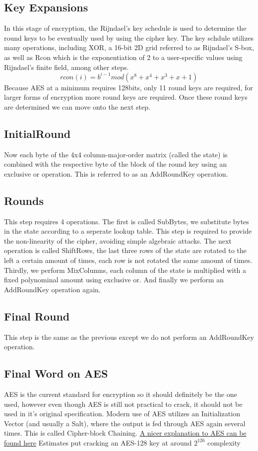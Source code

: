 \documentclass[a4paper, 11pt]{article}
\begin{document}
\subsection*{Key Expansions}
In this stage of encryption, the Rijndael's key schedule is used to determine the round keys to be eventually used by using the cipher key.  The key schdule utilizes many operations, including XOR, a 16-bit 2D grid referred to as Rijndael's S-box, as well as Rcon which is the exponentiation of 2 to a user-specific values using Rijndael's finite field, among other steps. 
\[ rcon(i) = b^{i-1} mod (x^8 + x^4 + x^3 + x + 1)\]
Because AES at a minimum requires 128bits, only 11 round keys are required, for larger forms of encryption more round keys are required.  Once these round keys are determined we can move onto the next step.

\subsection*{InitialRound}
Now each byte of the 4x4 column-major-order matrix (called the state) is combined with the respective byte of the block of the round key using an exclusive or operation. This is referred to as an AddRoundKey operation.

\subsection*{Rounds}
This step requires 4 operations.  The first is called SubBytes, we substitute bytes in the state according to a seperate lookup table.  This step is required to provide the non-linearity of the cipher, avoiding simple algebraic attacks.  The next operation is called ShiftRows, the last three rows of the state are rotated to the left a certain amount of times, each row is not rotated the same amount of times.  Thirdly, we perform MixColumns, each column of the state is multiplied with a fixed polynominal amount using exclusive or.  And finally we perform an AddRoundKey operation again.

\subsection*{Final Round}
This step is the same as the previous except we do not perform an AddRoundKey operation.

\subsection*{Final Word on AES}
AES is the current standard for encryption so it should definitely be the one used, however even though AES is still not practical to crack, it should not be used in it's original specification.  Modern use of AES utilizes an Initialization Vector (and usually a Salt), where the output is fed through AES again several times.  This is called Cipher-block Chaining. \href{http://www.moserware.com/2009/09/stick-figure-guide-to-advanced.html}{A nicer explanation to AES can be found here} Estimates put cracking an AES-128 key at around $2^{126}$ complexity
\end{document}
